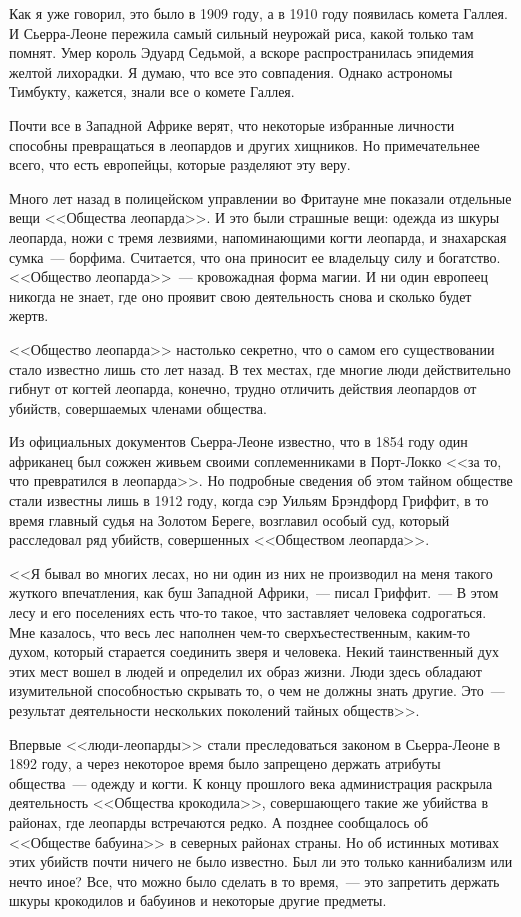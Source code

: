 \documentclass[12pt,a4paper,twoside,openany,svgnames]{memoir}
\begin{document}
Как я уже говорил, это было в 1909 году, а в 1910 году появилась комета Галлея. И Сьерра-Леоне пережила самый сильный неурожай риса, какой только там помнят. Умер король Эдуард Седьмой, а вскоре распространилась эпидемия желтой лихорадки. Я думаю, что все это совпадения. Однако астрономы Тимбукту, кажется, знали все о комете Галлея.

Почти все в Западной Африке верят, что некоторые избранные личности способны превращаться в леопардов и других хищников. Но примечательнее всего, что есть европейцы, которые разделяют эту веру.

Много лет назад в полицейском управлении во Фритауне мне показали отдельные вещи <<Общества леопарда>>. И это были страшные вещи: одежда из шкуры леопарда, ножи с тремя лезвиями, напоминающими когти леопарда, и знахарская сумка~--- борфима. Считается, что она приносит ее владельцу силу и богатство. <<Общество леопарда>>~--- кровожадная форма магии. И ни один европеец никогда не знает, где оно проявит свою деятельность снова и сколько будет жертв.

<<Общество леопарда>> настолько секретно, что о самом его существовании стало известно лишь сто лет назад. В тех местах, где многие люди действительно гибнут от когтей леопарда, конечно, трудно отличить действия леопардов от убийств, совершаемых членами общества.

Из официальных документов Сьерра-Леоне известно, что в 1854 году один африканец был сожжен живьем своими соплеменниками в Порт-Локко <<за то, что превратился в леопарда>>. Но подробные сведения об этом тайном обществе стали известны лишь в 1912 году, когда сэр Уильям Брэндфорд Гриффит, в то время главный судья на Золотом Береге, возглавил особый суд, который расследовал ряд убийств, совершенных <<Обществом леопарда>>.

<<Я бывал во многих лесах, но ни один из них не производил на меня такого жуткого впечатления, как буш Западной Африки,~--- писал Гриффит.~--- В этом лесу и его поселениях есть что-то такое, что заставляет человека содрогаться. Мне казалось, что весь лес наполнен чем-то сверхъестественным, каким-то духом, который старается соединить зверя и человека. Некий таинственный дух этих мест вошел в людей и определил их образ жизни. Люди здесь обладают изумительной способностью скрывать то, о чем не должны знать другие. Это~--- результат деятельности нескольких поколений тайных обществ>>.

Впервые <<люди-леопарды>> стали преследоваться законом в Сьерра-Леоне в 1892 году, а через некоторое время было запрещено держать атрибуты общества~--- одежду и когти. К концу прошлого века администрация раскрыла деятельность <<Общества крокодила>>, совершающего такие же убийства в районах, где леопарды встречаются редко. А позднее сообщалось об <<Обществе бабуина>> в северных районах страны. Но об истинных мотивах этих убийств почти ничего не было известно. Был ли это только каннибализм или нечто иное? Все, что можно было сделать в то время,~--- это запретить держать шкуры крокодилов и бабуинов и некоторые другие предметы.
\end{document}
